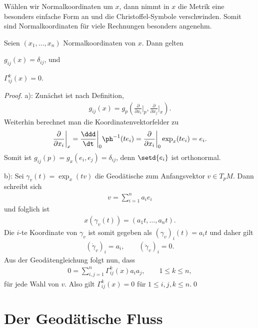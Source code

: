 \documentclass[%
	paper=a5,%
	fleqn,%
	DIV=18,%
	BCOR=0mm,
	fontsize=11pt,
	titlepage=false,%
	bibliography=totoc,
	DIV=18,%
	twoside=true,
	pdftitle=Riemannsche Geometrie,
	pdfauthor=Uwe Semmelmann,
	numbers=noendperiod]%
	{scrbook}
\begin{document}
Wählen wir Normalkoordinaten um $x$, dann nimmt in $x$ die Metrik eine besonders
einfache Form an und die Christoffel-Symbole verschwinden. Somit sind
Normalkoordinaten für viele Rechnungen besonders angenehm.

\begin{prop}
Seien $(x_1,\ldots,x_n)$ Normalkoordinaten von $x$. Dann gelten
\begin{propenum}
\item $g_{ij}(x) = \delta_{ij}$, und
\item $\Gamma_{ij}^k(x) = 0$.\fish
\end{propenum} 
\end{prop}
\begin{proof}
a): Zunächst ist nach Definition,
\begin{align*}
g_{ij}(x) = g_p\left(\frac{\partial}{\partial
x_i}\bigg|_p,\frac{\partial}{\partial x_j}\bigg|_x \right).
\end{align*}
Weiterhin berechnet man die Koordinatenvektorfelder zu
\begin{align*}
\frac{\partial}{\partial x_i}\bigg|_x = \frac{\ddd}{\dt}\bigg|_0 \ph^{-1}(t e_i)
= \frac{\partial}{\partial x_i}\bigg|_0 \exp_x(t e_i) = e_i.
\end{align*}
Somit ist $g_{ij}(p) = g_x(e_i,e_j) = \delta_{ij}$, denn $\setd{e_i}$ ist
orthonormal.

b): Sei $\gamma_v(t) = \exp_x(tv)$ die Geodätische zum Anfangsvektor $v\in
T_pM$. Dann schreibt sich 
\begin{align*}
v = \sum_{i=1}^n a_i e_i
\end{align*}
und folglich ist
\begin{align*}
x(\gamma_v(t)) = (a_1t,\ldots,a_n t).
\end{align*}
Die $i$-te Koordinate von $\gamma_v$ ist somit gegeben als $(\gamma_v)_i(t) =
a_i t$ und daher gilt
\begin{align*}
(\dot{\gamma}_v)_i = a_i,\qquad (\ddot{\gamma}_v)_i = 0.
\end{align*}
Aus der Geodätengleichung folgt nun, dass 
\begin{align*}
0 = \sum_{i,j=1}^n \Gamma_{ij}^k(x) a_i a_j,\qquad 1\le k\le n,
\end{align*}
für jede Wahl von $v$. Also gilt $\Gamma_{ij}^k(x) = 0$ für $1\le i,j,k\le
n$.\qed
\end{proof}

\section{Der Geodätische Fluss}
\end{document}
